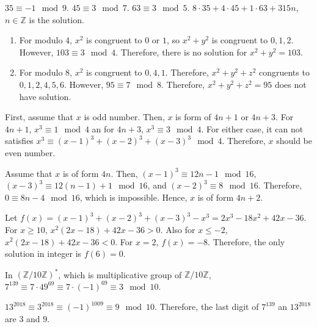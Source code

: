 \documentclass[12pt]{article}
\newenvironment{problem}[2][Problem]{\begin{trivlist}
\item[\hskip \labelsep {\bfseries #1}\hskip \labelsep {\bfseries #2.}]}{\end{trivlist}}
\begin{document}
$35\equiv -1 \mod 9$. $45\equiv 3 \mod 7$. $63 \equiv 3 \mod 5$. $8\cdot 35+4\cdot45+1\cdot63+315n$, $n\in \mathbb{Z}$ is the solution.

\begin{problem}{4}
\end{problem}
\begin{enumerate}
\item[(i)] For modulo $4$, $x^2$ is congruent to $0$ or $1$, so $x^2+y^2$ is congruent to $0,1,2$. However, $103\equiv 3 \mod 4$. Therefore, there is no solution for $x^2+y^2=103$.
\item[(ii)] For modulo $8$, $x^2$ is congruent to $0, 4, 1$. Therefore, $x^2+y^2+z^2$ congruents to $0, 1, 2, 4, 5, 6$. However, $95\equiv 7 \mod 8$. Therefore, $x^2+y^2+z^2=95$ does not have solution.
\end{enumerate}
\newpage
\begin{problem}{5}
\end{problem}


First, assume that $x$ is odd number. Then, $x$ is form of $4n+1$ or $4n+3$. For $4n+1$, $x^3\equiv 1 \mod 4$ an for $4n+3$, $x^3\equiv 3 \mod 4$. For either case, it can not satisfies $x^3\equiv(x-1)^3+(x-2)^3+(x-3)^3 \mod 4$. Therefore, $x$ should be even number.

Assume that $x$ is of form $4n$. Then, $(x-1)^3\equiv 12n-1 \mod 16$, $(x-3)^3\equiv 12(n-1)+1 \mod 16$, and $(x-2)^3\equiv 8 \mod 16$. Therefore, $0\equiv 8n-4 \mod 16$, which is impossible. Hence, $x$ is of form $4n+2$.

Let $f(x)=(x-1)^3+(x-2)^3+(x-3)^3-x^3=2x^3-18x^2+42x-36$. For $x\geq 10$, $x^2(2x-18)+42x-36>0$. Also for $x\leq -2$, $x^2(2x-18)+42x-36<0$. For $x=2$, $f(x)=-8$. Therefore, the only solution in integer is $f(6)=0$.


\begin{problem}{6}
\end{problem}
In $(\mathbb{Z}/10\mathbb{Z})^*$, which is multiplicative group of $\mathbb{Z}/10\mathbb{Z}$, $7^{139}\equiv7\cdot 49^{69}\equiv 7\cdot (-1)^{69}\equiv 3 \mod 10$.

$13^{2018}\equiv 3^{2018}\equiv (-1)^{1009}\equiv 9 \mod 10$. Therefore, the last digit of $7^{139}$ an $13^{2018}$ are $3$ and $9$.
\end{document}
